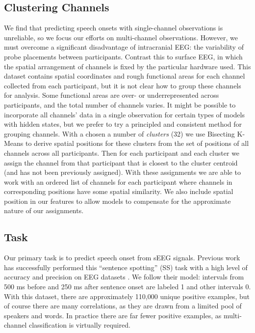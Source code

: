 \documentclass[format=sigconf, nonacm=true, review=false, screen=true]{acmart}
\newcommand{\TODO}[1]{\textcolor{red}{TODO: #1}}
\begin{document}
\subsection{Clustering Channels}

We find that predicting speech onsets with single-channel observations is unreliable, so we focus our efforts on multi-channel observations. However, we must overcome a significant disadvantage of intracranial EEG: the variability of probe placements between participants. Contrast this to surface EEG, in which the spatial arrangement of channels is fixed by the particular hardware used. This dataset contains spatial coordinates and rough functional areas for each channel collected from each participant, but it is not clear how to group these channels for analysis. Some functional areas are over- or underrepresented across participants, and the total number of channels varies. It might be possible to incorporate all channels' data in a single observation for certain types of models with hidden states, but we prefer to try a principled and consistent method for grouping channels. With a chosen a number of \textit{clusters} (32) we use Bisecting K-Means to derive spatial positions for these clusters from the set of positions of all channels across all participants. Then for each participant and each cluster we assign the channel from that participant that is closest to the cluster centroid (and has not been previously assigned). With these assignments we are able to work with an ordered list of channels for each participant where channels in corresponding positions have some spatial similarity. We also include spatial position in our features to allow models to compensate for the approximate nature of our assignments.



\subsection{Task}

Our primary task is to predict speech onset from sEEG signals. Previous work has successfully performed this ``sentence spotting'' (SS) task with a high level of accuracy and precision on EEG datasets \cite{sakthi2021keyword}. We follow their model: intervals from 500 ms before and 250 ms after sentence onset are labeled 1 and other intervals 0. With this dataset, there are approximately 110,000 unique positive examples, but of course there are many correlations, as they are drawn from a limited pool of speakers and words. In practice there are far fewer positive examples, as multi-channel classification is virtually required.
\end{document}
